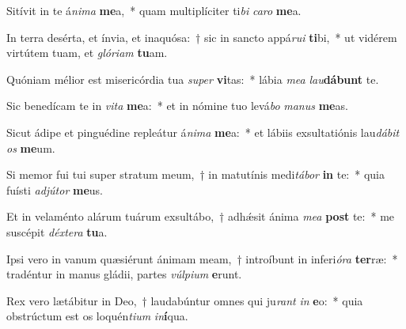 \item Sitívit in te á\textit{ni}\textit{ma} \textbf{me}a,~* quam multiplíciter ti\textit{bi} \textit{ca}\textit{ro} \textbf{me}a.
\item In terra desérta, et ínvia, et inaquósa:~† sic in sancto appá\textit{ru}\textit{i} \textbf{ti}bi,~* ut vidérem virtútem tuam, et \textit{gló}\textit{ri}\textit{am} \textbf{tu}am.
\item Quóniam mélior est misericórdia tua \textit{su}\textit{per} \textbf{vi}tas:~* lábia \textit{me}\textit{a} \textit{lau}\textbf{dá}\textbf{bunt} te.
\item Sic benedícam te in \textit{vi}\textit{ta} \textbf{me}a:~* et in nómine tuo levá\textit{bo} \textit{ma}\textit{nus} \textbf{me}as.
\item Sicut ádipe et pinguédine repleátur á\textit{ni}\textit{ma} \textbf{me}a:~* et lábiis exsultatiónis lau\textit{dá}\textit{bit} \textit{os} \textbf{me}um.
\item Si memor fui tui super stratum meum,~† in matutínis medi\textit{tá}\textit{bor} \textbf{in} te:~* quia fuísti \textit{ad}\textit{jú}\textit{tor} \textbf{me}us.
\item Et in velaménto alárum tuárum exsultábo,~† adhǽsit ánima \textit{me}\textit{a} \textbf{post} te:~* me suscépit \textit{déx}\textit{te}\textit{ra} \textbf{tu}a.
\item Ipsi vero in vanum quæsiérunt ánimam meam,~† introíbunt in inferi\textit{ó}\textit{ra} \textbf{ter}ræ:~* tradéntur in manus gládii, partes \textit{vúl}\textit{pi}\textit{um} \textbf{e}runt.
\item Rex vero lætábitur in Deo,~† laudabúntur omnes qui ju\textit{rant} \textit{in} \textbf{e}o:~* quia obstrúctum est os loquén\textit{ti}\textit{um} \textit{in}\textbf{í}qua.
